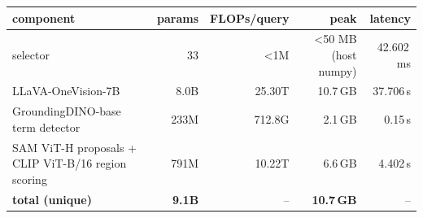 \begin{tabular}{lrrrr}
\toprule
component & params & FLOPs/query & peak & latency \\
\midrule
selector & 33 & <1M & <50 MB (host numpy) & 42.602\,ms \\
LLaVA-OneVision-7B & 8.0B & 25.30T & 10.7\,GB & 37.706\,s \\
GroundingDINO-base term detector & 233M & 712.8G & 2.1\,GB & 0.15\,s \\
SAM ViT-H proposals + CLIP ViT-B/16 region scoring & 791M & 10.22T & 6.6\,GB & 4.402\,s \\
\midrule
\textbf{total (unique)} & \textbf{9.1B} & -- & \textbf{10.7\,GB} & -- \\
\bottomrule
\end{tabular}
